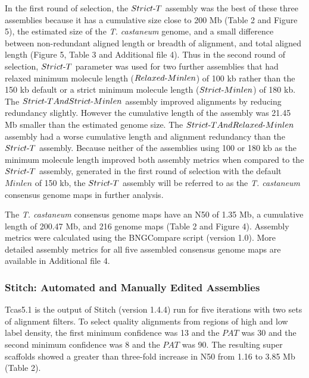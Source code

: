\documentclass{bmcart}
\begin{document}
In the first round of selection, the $Strict\textnormal{-}T$ assembly was the best of these three assemblies because it has a cumulative size close to 200 Mb (Table 2 and Figure 5), the estimated size of the \textit{T. castaneum} genome, and a small difference between non-redundant aligned length or breadth of alignment, and total aligned length (Figure 5, Table 3 and Additional file 4). Thus in the second round of selection, $Strict\textnormal{-}T$ parameter was used for two further assemblies that had relaxed minimum molecule length ($Relaxed\textnormal{-}Minlen$) of 100 kb rather than the 150 kb default or a strict minimum molecule length ($Strict\textnormal{-}Minlen$) of 180 kb. The $Strict\textnormal{-}TAndStrict\textnormal{-}Minlen$ assembly improved alignments by reducing redundancy slightly. However the cumulative length of the assembly was 21.45 Mb smaller than the estimated genome size. The $Strict\textnormal{-}TAndRelaxed\textnormal{-}Minlen$ assembly had a worse cumulative length and alignment redundancy than the $Strict\textnormal{-}T$ assembly. Because neither of the assemblies using 100 or 180 kb as the minimum molecule length improved both assembly metrics when compared to the $Strict\textnormal{-}T$ assembly, generated in the first round of selection with the default $Minlen$ of 150 kb, the $Strict\textnormal{-}T$ assembly will be referred to as the \textit{T. castaneum} consensus genome maps in further analysis.

The \textit{T. castaneum} consensus genome maps have an N50 of 1.35 Mb, a cumulative length of 200.47 Mb, and 216 genome maps (Table 2 and Figure 4). Assembly metrics were calculated using the BNGCompare script (version 1.0). More detailed assembly metrics for all five assembled consensus genome maps are available in Additional file 4.

\subsubsection*{Stitch: Automated and Manually Edited Assemblies}

Tcas5.1 is the output of Stitch (version 1.4.4) run for five iterations with two sets of alignment filters. To select quality alignments from regions of high and low label density, the first minimum confidence was 13 and the $PAT$ was 30 and the second minimum confidence was 8 and the $PAT$ was 90. The resulting super scaffolds showed a greater than three-fold increase in N50 from 1.16 to 3.85 Mb (Table 2). 
\end{document}
